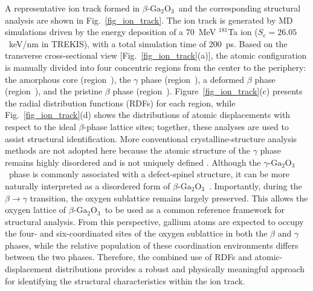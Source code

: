 \documentclass[%
reprint,
superscriptaddress,
 amsmath,amssymb,
 aps,
]{revtex4-2}
\newcommand{\ga}{$\text{Ga}_2\text{O}_3$}
\begin{document}
A representative ion track formed in $\beta$-\ga\ and the corresponding structural
analysis are shown in Fig.~\ref{fig_ion_track}.
The ion track is generated by MD simulations driven by the energy deposition of a
70~MeV $^{181}$Ta ion ($S_e = 26.05$~keV/nm in TREKIS), with a total simulation time of 200~ps.
Based on the transverse cross-sectional view
[Fig.~\ref{fig_ion_track}(a)], the atomic configuration is manually divided into four
concentric regions from the center to the periphery:
the amorphous core (region~),
the $\gamma$ phase (region~),
a deformed $\beta$ phase (region~),
and the pristine $\beta$ phase (region~).
Figure~\ref{fig_ion_track}(c) presents the radial distribution functions (RDFs) for each
region, while Fig.~\ref{fig_ion_track}(d) shows the distributions of atomic displacements
with respect to the ideal $\beta$-phase lattice sites; together, these analyses are used
to assist structural identification. 
More conventional crystalline-structure analysis methods are not adopted here because
the atomic structure of the $\gamma$ phase remains highly disordered and is not uniquely
defined \cite{ratcliff_tackling_2022}.
Although the $\gamma$-\ga\ phase is commonly associated with a defect-spinel structure,
it can be more naturally interpreted as a disordered form of $\beta$-\ga\ \cite{huang_nature_2024}.
Importantly, during the $\beta \to \gamma$ transition, the oxygen sublattice remains
largely preserved. 
This allows the oxygen lattice of $\beta$-\ga\ to be used as a common reference framework
for structural analysis.
From this perspective, gallium atoms are expected to occupy the four- and six-coordinated
sites of the oxygen sublattice in both the $\beta$ and $\gamma$ phases, while the relative
population of these coordination environments differs between the two phases.
Therefore, the combined use of RDFs and atomic-displacement distributions provides a
robust and physically meaningful approach for identifying the structural characteristics
within the ion track.
\end{document}
